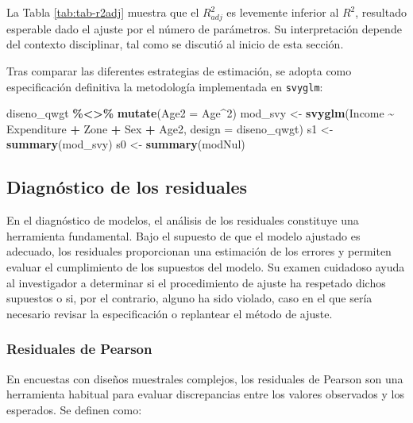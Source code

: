 \documentclass[
  spanish,
  12pt,
]{book}
\newenvironment{Shaded}{\begin{snugshade}}{\end{snugshade}}
\newcommand{\AttributeTok}[1]{\textcolor[rgb]{0.13,0.29,0.53}{#1}}
\newcommand{\DecValTok}[1]{\textcolor[rgb]{0.00,0.00,0.81}{#1}}
\newcommand{\FunctionTok}[1]{\textcolor[rgb]{0.13,0.29,0.53}{\textbf{#1}}}
\newcommand{\NormalTok}[1]{#1}
\newcommand{\OtherTok}[1]{\textcolor[rgb]{0.56,0.35,0.01}{#1}}
\newcommand{\SpecialCharTok}[1]{\textcolor[rgb]{0.81,0.36,0.00}{\textbf{#1}}}
\begin{document}
La Tabla \ref{tab:tab-r2adj} muestra que el \(R_{adj}^{2}\) es levemente inferior al \(R^{2}\), resultado esperable dado el ajuste por el número de parámetros. Su interpretación depende del contexto disciplinar, tal como se discutió al inicio de esta sección.

Tras comparar las diferentes estrategias de estimación, se adopta como especificación definitiva la metodología implementada en \texttt{svyglm}:

\begin{Shaded}
\begin{Highlighting}[]
\NormalTok{diseno\_qwgt }\SpecialCharTok{\%\textless{}\textgreater{}\%} \FunctionTok{mutate}\NormalTok{(}\AttributeTok{Age2 =}\NormalTok{ Age}\SpecialCharTok{\^{}}\DecValTok{2}\NormalTok{)}
\NormalTok{mod\_svy }\OtherTok{\textless{}{-}} \FunctionTok{svyglm}\NormalTok{(Income }\SpecialCharTok{\textasciitilde{}}\NormalTok{ Expenditure }\SpecialCharTok{+}\NormalTok{ Zone }\SpecialCharTok{+}\NormalTok{ Sex }\SpecialCharTok{+}\NormalTok{ Age2,}
                  \AttributeTok{design =}\NormalTok{ diseno\_qwgt)}
\NormalTok{s1 }\OtherTok{\textless{}{-}} \FunctionTok{summary}\NormalTok{(mod\_svy)}
\NormalTok{s0 }\OtherTok{\textless{}{-}} \FunctionTok{summary}\NormalTok{(modNul)}
\end{Highlighting}
\end{Shaded}

\subsection{Diagnóstico de los residuales}\label{diagnuxf3stico-de-los-residuales}

En el diagnóstico de modelos, el análisis de los residuales constituye una herramienta fundamental. Bajo el supuesto de que el modelo ajustado es adecuado, los residuales proporcionan una estimación de los errores y permiten evaluar el cumplimiento de los supuestos del modelo. Su examen cuidadoso ayuda al investigador a determinar si el procedimiento de ajuste ha respetado dichos supuestos o si, por el contrario, alguno ha sido violado, caso en el que sería necesario revisar la especificación o replantear el método de ajuste.

\subsubsection{Residuales de Pearson}\label{residuales-de-pearson}

En encuestas con diseños muestrales complejos, los residuales de Pearson son una herramienta habitual para evaluar discrepancias entre los valores observados y los esperados. Se definen como:
\end{document}
